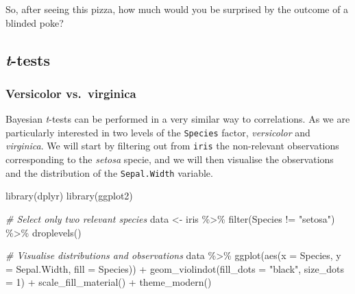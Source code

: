 \documentclass[10pt,a4paper,onecolumn]{article}
\newenvironment{Shaded}{\begin{snugshade}}{\end{snugshade}}
\newcommand{\AttributeTok}[1]{\textcolor[rgb]{0.77,0.63,0.00}{#1}}
\newcommand{\CommentTok}[1]{\textcolor[rgb]{0.56,0.35,0.01}{\textit{#1}}}
\newcommand{\DecValTok}[1]{\textcolor[rgb]{0.00,0.00,0.81}{#1}}
\newcommand{\FunctionTok}[1]{\textcolor[rgb]{0.00,0.00,0.00}{#1}}
\newcommand{\NormalTok}[1]{#1}
\newcommand{\OtherTok}[1]{\textcolor[rgb]{0.56,0.35,0.01}{#1}}
\newcommand{\SpecialCharTok}[1]{\textcolor[rgb]{0.00,0.00,0.00}{#1}}
\newcommand{\StringTok}[1]{\textcolor[rgb]{0.31,0.60,0.02}{#1}}
\begin{document}
So, after seeing this pizza, how much would you be surprised by the
outcome of a blinded poke?

\hypertarget{t-tests}{%
\subsection{\texorpdfstring{\emph{t}-tests}{t-tests}}\label{t-tests}}

\hypertarget{versicolor-vs.-virginica}{%
\subsubsection{Versicolor
vs.~virginica}\label{versicolor-vs.-virginica}}

Bayesian \emph{t}-tests can be performed in a very similar way to
correlations. As we are particularly interested in two levels of the
\texttt{Species} factor, \emph{versicolor} and \emph{virginica}. We will
start by filtering out from \texttt{iris} the non-relevant observations
corresponding to the \emph{setosa} specie, and we will then visualise
the observations and the distribution of the \texttt{Sepal.Width}
variable.

\begin{Shaded}
\begin{Highlighting}[]
\FunctionTok{library}\NormalTok{(dplyr)}
\FunctionTok{library}\NormalTok{(ggplot2)}

\CommentTok{\# Select only two relevant species}
\NormalTok{data }\OtherTok{\textless{}{-}}\NormalTok{ iris }\SpecialCharTok{\%\textgreater{}\%}
  \FunctionTok{filter}\NormalTok{(Species }\SpecialCharTok{!=} \StringTok{"setosa"}\NormalTok{) }\SpecialCharTok{\%\textgreater{}\%}
  \FunctionTok{droplevels}\NormalTok{()}

\CommentTok{\# Visualise distributions and observations}
\NormalTok{data }\SpecialCharTok{\%\textgreater{}\%}
  \FunctionTok{ggplot}\NormalTok{(}\FunctionTok{aes}\NormalTok{(}\AttributeTok{x =}\NormalTok{ Species, }\AttributeTok{y =}\NormalTok{ Sepal.Width, }\AttributeTok{fill =}\NormalTok{ Species)) }\SpecialCharTok{+}
  \FunctionTok{geom\_violindot}\NormalTok{(}\AttributeTok{fill\_dots =} \StringTok{"black"}\NormalTok{, }\AttributeTok{size\_dots =} \DecValTok{1}\NormalTok{) }\SpecialCharTok{+}
  \FunctionTok{scale\_fill\_material}\NormalTok{() }\SpecialCharTok{+}
  \FunctionTok{theme\_modern}\NormalTok{()}
\end{Highlighting}
\end{Shaded}
\end{document}
